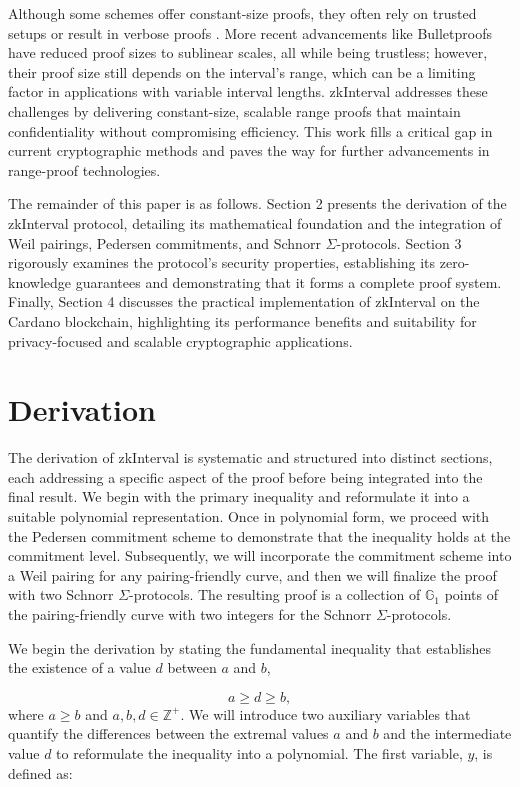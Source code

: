 \documentclass{iacrcc}
\theoremstyle{definition}
\begin{document}
Although some schemes offer constant-size proofs, they often rely on trusted setups or result in verbose proofs \cite{christetal2024}. More recent advancements like Bulletproofs \cite{bunz2018bulletproofs} have reduced proof sizes to sublinear scales, all while being trustless; however, their proof size still depends on the interval's range, which can be a limiting factor in applications with variable interval lengths. zkInterval addresses these challenges by delivering constant-size, scalable range proofs that maintain confidentiality without compromising efficiency. This work fills a critical gap in current cryptographic methods and paves the way for further advancements in range-proof technologies.

The remainder of this paper is as follows. Section 2 presents the derivation of the zkInterval protocol, detailing its mathematical foundation and the integration of Weil pairings, Pedersen commitments, and Schnorr $\Sigma$-protocols. Section 3 rigorously examines the protocol's security properties, establishing its zero-knowledge guarantees and demonstrating that it forms a complete proof system. Finally, Section 4 discusses the practical implementation of zkInterval on the Cardano blockchain, highlighting its performance benefits and suitability for privacy-focused and scalable cryptographic applications.

\section{Derivation}

The derivation of zkInterval is systematic and structured into distinct sections, each addressing a specific aspect of the proof before being integrated into the final result. We begin with the primary inequality and reformulate it into a suitable polynomial representation. Once in polynomial form, we proceed with the Pedersen commitment scheme to demonstrate that the inequality holds at the commitment level. Subsequently, we will incorporate the commitment scheme into a Weil pairing for any pairing-friendly curve, and then we will finalize the proof with two Schnorr $\Sigma$-protocols. The resulting proof is a collection of \(\mathbb{G}_{1}\) points of the pairing-friendly curve with two integers for the Schnorr $\Sigma$-protocols.

We begin the derivation by stating the fundamental inequality that establishes the existence of a value $d$ between $a$ and $b$,

\begin{equation}
a \geq d \geq b,
\end{equation}
where \( a \geq b \) and \( a, b, d \in \mathbb{Z}^+ \). We will introduce two auxiliary variables that quantify the differences between the extremal values \(a\) and \(b\) and the intermediate value \(d\) to reformulate the inequality into a polynomial. The first variable, \( y \), is defined as:
\end{document}
